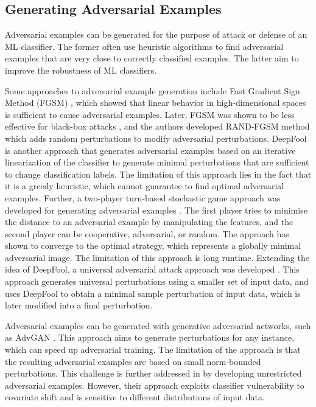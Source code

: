 \documentclass[letterpaper]{article} %
\begin{document}
\subsection{Generating Adversarial Examples}
Adversarial examples can be generated for the purpose of attack or defense of an ML classifier. The former often use heuristic algorithms to find adversarial examples that are very close to correctly classified examples. The latter aim to improve the robustness of ML classifiers. 

Some approaches to adversarial example generation include Fast Gradient Sign Method (FGSM) \cite{Goodfellow2015}, which showed that linear behavior in high-dimensional spaces is sufficient to cause adversarial examples. Later, FGSM was shown to be less effective for black-box attacks \cite{Tramr2017}, and the authors developed RAND-FGSM method which adds random perturbations to modify adversarial perturbations. DeepFool \cite{Moosavi2016} is another approach that generates adversarial examples based on an iterative linearization of the classifier to generate minimal perturbations that are sufficient to change classification labels. The limitation of this approach lies in the fact that it is a greedy heuristic, which cannot guarantee to find optimal adversarial examples. Further, a two-player turn-based stochastic game approach was developed for generating adversarial examples \cite{Wicker2018}. The first player tries to minimise the distance to an adversarial example by manipulating the features, and the second player can be cooperative, adversarial, or random. The approach has shown to converge to the optimal strategy, which represents a globally minimal adversarial image. The limitation of this approach is long runtime. Extending the idea of DeepFool, a universal adversarial attack approach was developed \cite{Moosavi2017}. This approach generates universal perturbations using a smaller set of input data, and uses DeepFool to obtain a minimal sample perturbation of input data, which is later modified into a final perturbation. 

Adversarial examples can be generated with generative adversarial networks, such as AdvGAN \cite{Xiao2018}. This approach aims to generate perturbations for any instance, which can speed up adversarial training. The limitation of the approach is that the resulting adversarial examples are based on small norm-bounded perturbations. This challenge is further addressed in \cite{Song2018} by developing unrestricted adversarial examples. However, their approach exploits classifier vulnerability to covariate shift and is sensitive to different distributions of input data.
\end{document}
